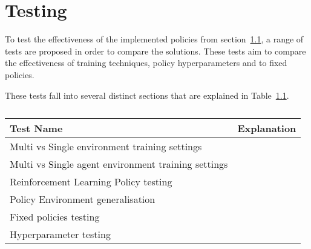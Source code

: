 \chapter{Testing}\label{ch:testing-of-the-implementation}
To test the effectiveness of the implemented policies from section~\ref{}, a range of tests are proposed in order to
compare the solutions. These tests aim to compare the effectiveness of training techniques, policy hyperparameters and
to fixed policies.

These tests fall into several distinct sections that are explained in Table~\ref{}.

\begin{table}[h]
    \centering
    \begin{tabular}{l|l} \hline
        Test Name & Explanation \\ \hline
        Multi vs Single environment training settings & \\ \hline
        Multi vs Single agent environment training settings &  \\ \hline
        Reinforcement Learning Policy testing & \\ \hline
        Policy Environment generalisation & \\ \hline
        Fixed policies testing & \\ \hline
        Hyperparameter testing & \\ \hline
    \end{tabular}
    \caption{}
    \label{}
\end{table}

